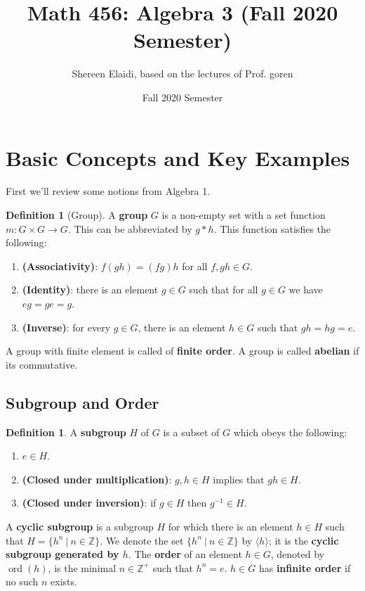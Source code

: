 \documentclass[psamsfonts]{amsart}
\title[Math 456: Algebra 3]{Math 456: Algebra 3 (Fall 2020 Semester)}
\author{Shereen Elaidi, based on the lectures of Prof. goren}
\date{Fall 2020 Semester}
\theoremstyle{definition}
\newtheorem{defn}[thm]{Definition}
\theoremstyle{remark}
\newcommand{\Z}[0]{\mathbb{Z}}
\numberwithin{equation}{section}
\begin{document}
\maketitle


\section{Basic Concepts and Key Examples}
First we'll review some notions from Algebra 1. 

\begin{defn}[Group]
	A \textbf{group} \( G \) is a non-empty set with a set function \( m: G \times G \rightarrow G \). This can be abbreviated by \( g * h \). This function satisfies the following: 
	\begin{enumerate}
		\item \textbf{(Associativity)}: \( f(gh) = (fg)h \) for all \(f, g h \in G \).
		\item \textbf{(Identity)}: there is an element \( g \in G \) such that for all \( g \in G \) we have \( eg = ge = g \). 
		\item \textbf{(Inverse)}: for every \( g \in G \), there is an element \( h \in G \) such that \( gh = hg = e \).
	\end{enumerate}
\end{defn}
A group with finite element is called of \textbf{finite order}. A group is called \textbf{abelian} if its commutative. 

\subsection{Subgroup and Order}
\begin{defn}
	A \textbf{subgroup} \( H \) of \( G \) is a subset of \( G \) which obeys the following:
	\begin{enumerate}
		\item \( e \in H \). 
		\item \textbf{(Closed under multiplication)}: \( g, h \in H \) implies that \( gh \in H \).
		\item \textbf{(Closed under inversion)}: if \( g \in H \) then \( g^{-1} \in H \).
	\end{enumerate}
\end{defn}

A \textbf{cyclic subgroup} is a subgroup \( H \) for which there is an element \( h \in H \) such that \( H = \{ h^n\ |\ n \in \Z \} \). We denote the set \( \{ h^n\ |\ n \in \Z \} \) by \( \langle h \rangle \); it is the \textbf{cyclic subgroup generated by \( h \)}. The \textbf{order} of an element \( h \in G \), denoted by \( \operatorname{ord}(h) \), is the minimal \( n \in \Z^+ \) such that \( h^n = e \). \( h \in G \) has \textbf{infinite order} if no such \( n \) exists.
\end{document}
